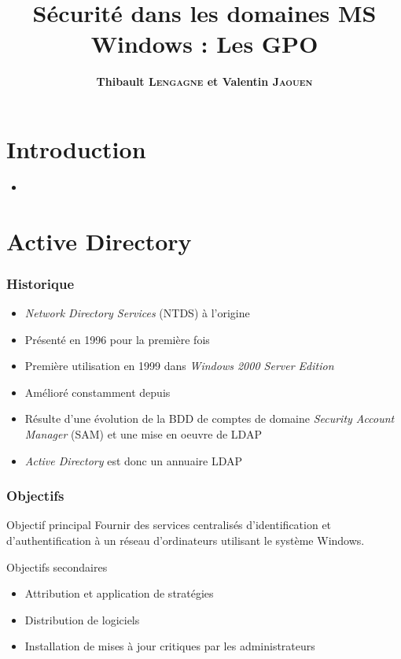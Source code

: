 \documentclass{beamer}
\title{Sécurité dans les domaines MS Windows : Les GPO}
\author{\textbf{Thibault \textsc{Lengagne} et Valentin \textsc{Jaouen}}}
\institute{Centrale Supélec - Campus de Rennes}
\begin{document}
  \begin{frame}
    \titlepage
  \end{frame}
  

  \section{Introduction}
  \begin{frame}
    \begin{itemize}
     \item 
    \end{itemize}
  \end{frame}
  
  \section{Active Directory}
  \begin{frame}
    \frametitle{Historique}
    \begin{itemize}
     \item \textit{Network Directory Services} (NTDS) à l'origine
     \item Présenté en 1996 pour la première fois
     \item Première utilisation en 1999 dans \textit{Windows 2000 Server Edition}
     \item Amélioré constamment depuis
     \item Résulte d'une évolution de la BDD de comptes de domaine \textit{Security Account Manager} (SAM) et une mise en oeuvre de LDAP
     \item \textit{Active Directory} est donc un annuaire LDAP
    \end{itemize}
  \end{frame}
  
  \begin{frame}
    \frametitle{Objectifs}
    \begin{block}{Objectif principal}
     Fournir des services centralisés d'identification et d'authentification à un réseau d'ordinateurs utilisant le système Windows.
    \end{block}
    \begin{block}{Objectifs secondaires}
     \begin{itemize}
      \item Attribution et application de stratégies
      \item Distribution de logiciels
      \item Installation de mises à jour critiques par les administrateurs
     \end{itemize}
    \end{block}
  \end{frame}
  
\end{document}
